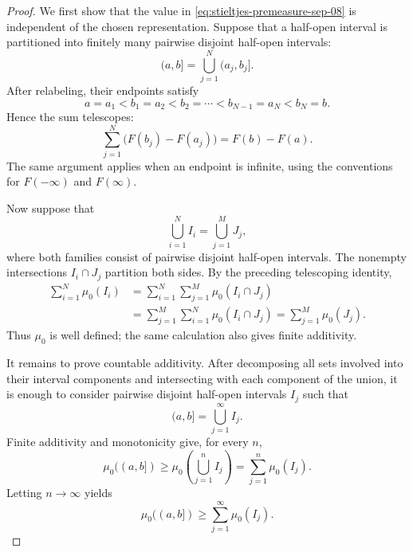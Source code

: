 \begin{proof}
  We first show that the value in
  \eqref{eq:stieltjes-premeasure-sep-08} is independent of the chosen
  representation. Suppose that a half-open interval is partitioned into
  finitely many pairwise disjoint half-open intervals:
  \[
    (a,b]=\bigcup_{j=1}^N(a_j,b_j].
  \]
  After relabeling, their endpoints satisfy
  \[
    a=a_1<b_1=a_2<b_2=\cdots<b_{N-1}=a_N<b_N=b.
  \]
  Hence the sum telescopes:
  \[
    \sum_{j=1}^N\bigl(F(b_j)-F(a_j)\bigr)=F(b)-F(a).
  \]
  The same argument applies when an endpoint is infinite, using the
  conventions for $F(-\infty)$ and $F(\infty)$.

  Now suppose that
  \[
    \bigcup_{i=1}^N I_i=\bigcup_{j=1}^M J_j,
  \]
  where both families consist of pairwise disjoint half-open intervals.
  The nonempty intersections $I_i\cap J_j$ partition both sides. By the
  preceding telescoping identity,
  \begin{align*}
    \sum_{i=1}^N\mu_0(I_i)
    &=\sum_{i=1}^N\sum_{j=1}^M\mu_0(I_i\cap J_j)\\
    &=\sum_{j=1}^M\sum_{i=1}^N\mu_0(I_i\cap J_j)
     =\sum_{j=1}^M\mu_0(J_j).
  \end{align*}
  Thus $\mu_0$ is well defined; the same calculation also gives finite
  additivity.

  It remains to prove countable additivity. After decomposing all sets
  involved into their interval components and intersecting with each
  component of the union, it is enough to consider pairwise disjoint
  half-open intervals $I_j$ such that
  \[
    (a,b]=\bigcup_{j=1}^{\infty}I_j.
  \]
  Finite additivity and monotonicity give, for every $n$,
  \[
    \mu_0((a,b])
    \geq\mu_0\left(\bigcup_{j=1}^n I_j\right)
    =\sum_{j=1}^n\mu_0(I_j).
  \]
  Letting $n\to\infty$ yields
  \begin{equation}\label{eq:stieltjes-first-inequality-sep-08}
    \mu_0((a,b])\geq\sum_{j=1}^{\infty}\mu_0(I_j).
  \end{equation}


\end{proof}
